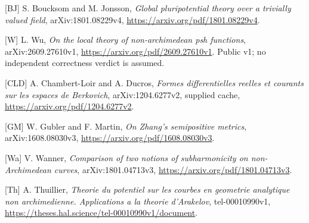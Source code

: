 \documentclass[
  11pt,
]{article}
\begin{document}
{[}BJ{]} S. Boucksom and M. Jonsson, \emph{Global pluripotential theory
over a trivially valued field}, arXiv:1801.08229v4,
\url{https://arxiv.org/pdf/1801.08229v4}.

{[}W{]} L. Wu, \emph{On the local theory of non-archimedean psh
functions}, arXiv:2609.27610v1,
\url{https://arxiv.org/pdf/2609.27610v1}. Public v1; no independent
correctness verdict is assumed.

{[}CLD{]} A. Chambert-Loir and A. Ducros, \emph{Formes differentielles
reelles et courants sur les espaces de Berkovich}, arXiv:1204.6277v2,
supplied cache, \url{https://arxiv.org/pdf/1204.6277v2}.

{[}GM{]} W. Gubler and F. Martin, \emph{On Zhang's semipositive
metrics}, arXiv:1608.08030v3, \url{https://arxiv.org/pdf/1608.08030v3}.

{[}Wa{]} V. Wanner, \emph{Comparison of two notions of subharmonicity on
non-Archimedean curves}, arXiv:1801.04713v3,
\url{https://arxiv.org/pdf/1801.04713v3}.

{[}Th{]} A. Thuillier, \emph{Theorie du potentiel sur les courbes en
geometrie analytique non archimedienne. Applications a la theorie
d'Arakelov}, tel-00010990v1,
\url{https://theses.hal.science/tel-00010990v1/document}.
\end{document}
